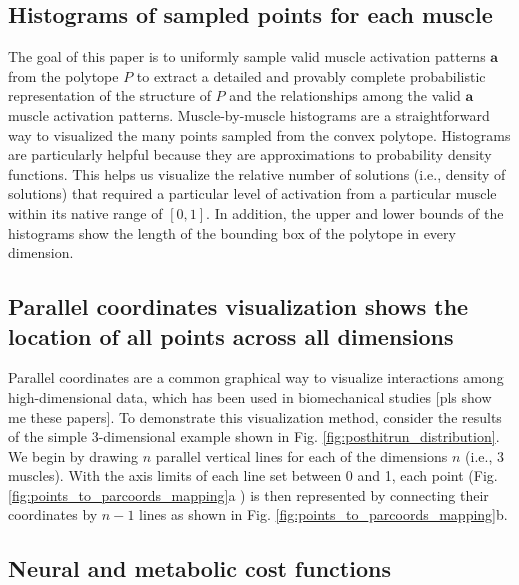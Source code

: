 \documentclass[10pt,letterpaper]{article}
\begin{document}
\subsection*{Histograms of sampled points for each muscle}
The goal of this paper is to uniformly sample valid  muscle activation patterns $\textbf{a}$ from the polytope $P$ to extract a detailed and provably complete probabilistic representation of the structure of $P$ and the relationships among the valid $\textbf{a}$ muscle activation patterns.  Muscle-by-muscle histograms are a straightforward way to visualized the many points sampled from the convex polytope.  Histograms are particularly helpful because they are approximations to probability density functions. This helps us visualize the relative number of solutions (i.e., density of solutions) that required a particular level of activation from a particular muscle within its native range of $[0,1]$. In addition, the upper and lower bounds of the histograms show the length of the bounding box of the polytope in every dimension.

\subsection*{Parallel coordinates visualization shows the location of all points across all dimensions}
Parallel coordinates are a common graphical way to visualize interactions among high-dimensional data, which has been used in biomechanical studies \cite{bachynskyi2013biomechanical, krekel2010visual} [pls show me these papers].
To demonstrate this visualization method, consider the results of the simple 3-dimensional example shown in Fig. \ref{fig:posthitrun_distribution}. We begin by drawing $n$ parallel vertical lines for each of the dimensions $n$ (i.e., 3 muscles).
With the axis limits of each line set between 0 and 1, each point (Fig. \ref{fig:points_to_parcoords_mapping}a ) is then represented by connecting their coordinates by $n-1$ lines as shown in Fig. \ref{fig:points_to_parcoords_mapping}b. 





\subsection*{Neural and metabolic cost functions}
\end{document}
